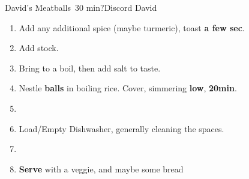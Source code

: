 \documentclass[]{mikescards}
\begin{document}
\begin{recipe}{David's Meatballs}{~30 min?}{Discord David}
\begin{parcolumns}[colwidths={1=120pt}, rulebetween]{2}
{\begin{enumerate}
      \item Add any additional spice (maybe turmeric), toast \textbf{a few sec}.
      \item Add stock.
      \item Bring to a boil, then add salt to taste.
      \item Nestle \textbf{balls} in boiling rice. Cover, simmering \textbf{low}, \textbf{20min}.
      \item
      \item Load/Empty Dishwasher, generally cleaning the spaces. 
      \item 
      \item \textbf{Serve} with a veggie, and maybe some bread
    \end{enumerate}
  }
\end{parcolumns}



\end{recipe}
\end{document}

